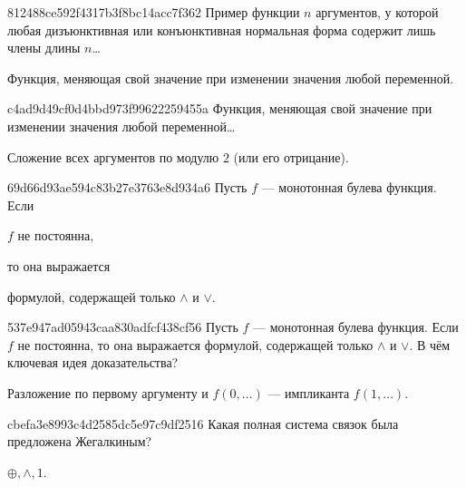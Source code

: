 \begin{note}{812488ce592f4317b3f8bc14acc7f362}
    Пример функции \({ n }\) аргументов, у которой любая дизъюнктивная или конъюнктивная нормальная форма содержит лишь члены длины \({ n }\)\ldots

    \begin{cloze}{1}
        Функция, меняющая свой значение при изменении значения любой переменной.
    \end{cloze}
\end{note}

\begin{note}{c4ad9d49cf0d4bbd973f99622259455a}
    Функция, меняющая свой значение при изменении значения любой переменной\ldots

    \begin{cloze}{1}
        Сложение всех аргументов по модулю \({ 2 }\) (или его отрицание).
    \end{cloze}
\end{note}

\begin{note}{69d66d93ae594c83b27e3763e8d934a6}
    Пусть \({ f }\) --- монотонная булева функция.
    Если \begin{icloze}{2}\({ f }\) не постоянна,\end{icloze} то она выражается \begin{icloze}{1}формулой, содержащей только \({ \land }\) и \({ \lor }\).\end{icloze}
\end{note}

\begin{note}{537e947ad05943caa830adfcf438cf56}
    Пусть \({ f }\) --- монотонная булева функция.
    Если \({ f }\) не постоянна, то она выражается формулой, содержащей только \({ \land }\) и \({ \lor }\).
    В чём ключевая идея доказательства?

    \begin{cloze}{1}
        Разложение по первому аргументу и \({ f(0, \ldots) }\) --- импликанта \({ f(1, \ldots) }\).
    \end{cloze}
\end{note}

\begin{note}{cbefa3e8993c4d2585dc5e97c9df2516}
    Какая полная система связок была предложена Жегалкиным?

    \begin{cloze}{1}
        \({ \oplus, \land, 1 }\).
    \end{cloze}
\end{note}

